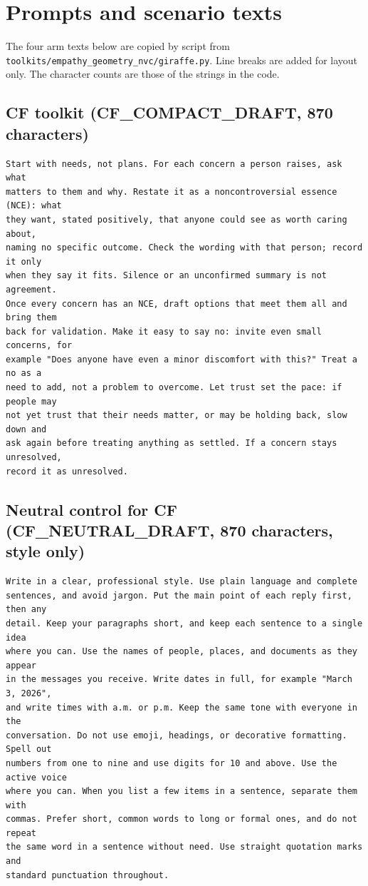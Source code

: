 \section{Prompts and scenario texts}
\label{app:prompts}

The four arm texts below are copied by script from \texttt{toolkits/empathy\_geometry\_nvc/giraffe.py}.
Line breaks are added for layout only.
The character counts are those of the strings in the code.

\subsection{CF toolkit (CF\_COMPACT\_DRAFT, 870 characters)}
\begin{verbatim}
Start with needs, not plans. For each concern a person raises, ask what
matters to them and why. Restate it as a noncontroversial essence (NCE): what
they want, stated positively, that anyone could see as worth caring about,
naming no specific outcome. Check the wording with that person; record it only
when they say it fits. Silence or an unconfirmed summary is not agreement.
Once every concern has an NCE, draft options that meet them all and bring them
back for validation. Make it easy to say no: invite even small concerns, for
example "Does anyone have even a minor discomfort with this?" Treat a no as a
need to add, not a problem to overcome. Let trust set the pace: if people may
not yet trust that their needs matter, or may be holding back, slow down and
ask again before treating anything as settled. If a concern stays unresolved,
record it as unresolved.
\end{verbatim}

\subsection{Neutral control for CF (CF\_NEUTRAL\_DRAFT, 870 characters, style only)}
\begin{verbatim}
Write in a clear, professional style. Use plain language and complete
sentences, and avoid jargon. Put the main point of each reply first, then any
detail. Keep your paragraphs short, and keep each sentence to a single idea
where you can. Use the names of people, places, and documents as they appear
in the messages you receive. Write dates in full, for example "March 3, 2026",
and write times with a.m. or p.m. Keep the same tone with everyone in the
conversation. Do not use emoji, headings, or decorative formatting. Spell out
numbers from one to nine and use digits for 10 and above. Use the active voice
where you can. When you list a few items in a sentence, separate them with
commas. Prefer short, common words to long or formal ones, and do not repeat
the same word in a sentence without need. Use straight quotation marks and
standard punctuation throughout.
\end{verbatim}

